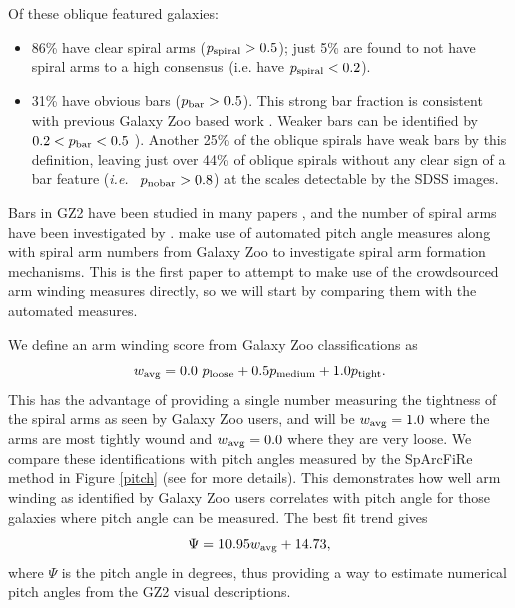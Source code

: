 \documentclass[usenatbib]{mn2e}
\newcommand{\ie}{{\it i.e.}}
\newcommand{\be}{\begin{equation}}
\newcommand{\ee}{\end{equation}}
\begin{document}
 Of these oblique featured galaxies: 
\begin{itemize}
\item {86}\% have clear spiral arms ($p_{\rm spiral} > 0.5$); just {5\%} are found to not have spiral arms to a high consensus (i.e. have $p_{\rm spiral}<0.2$). 
\item {31}\% have obvious bars ($p_{\rm bar}>0.5$). This strong bar fraction is consistent with previous Galaxy Zoo based work \citep[e.g.]{Masters2011, Masters2012}. Weaker bars can be identified by $0.2<p_{\rm bar}<0.5$ \citep[e.g.]{Willett2013, Skibba2012}). Another {25}\% of the oblique spirals have weak bars by this definition, leaving just over {44\%} of oblique spirals without any clear sign of a bar feature (\ie~ $p_{\rm no bar}>0.8$) at the scales detectable by the SDSS images. 
\end{itemize}

Bars in GZ2 have been studied in many papers \citep[e.g.]{Masters2011, Masters2012, Skibba2012, Cheung2013, Cheung2015, Galloway2015, Kruk2017, Kruk2018}, and the number of spiral arms have been investigated by \citep{Willett2015, Hart2016, Hart2017}. \citet{Hart2017b,Hart2018} make use of automated pitch angle measures along with spiral arm numbers from Galaxy Zoo to investigate spiral arm formation mechanisms. This is the first paper to attempt to make use of the crowdsourced arm winding measures directly, so we will start by comparing them with the automated measures. 

We define an arm winding score from Galaxy Zoo classifications as
\be
\label{eqn:winding}
w_{\rm avg} = 0.0 ~p_{\rm loose} + 0.5 p_{\rm medium} + 1.0 p_{\rm tight}.
\ee
This has the advantage of providing a single number measuring the tightness of the spiral arms as seen by Galaxy Zoo users, and will be $w_{\rm avg} = 1.0$ where the arms are most tightly wound and $w_{\rm avg} = 0.0$ where they are very loose. We compare these identifications with pitch angles measured by the SpArcFiRe method \citep{DavisHayes2014} in Figure \ref{pitch} (see \citealt{Hart2017b} for more details). This demonstrates how well arm winding as identified by Galaxy Zoo users correlates with pitch angle for those galaxies where pitch angle can be measured. The best fit trend gives 
\be
\label{eqn:pitch}
\Psi = 10.95 w_{\rm avg} + 14.73,
\ee
where $\Psi$ is the pitch angle in degrees, thus providing a way to estimate numerical pitch angles from the GZ2 visual descriptions. 
\end{document}
